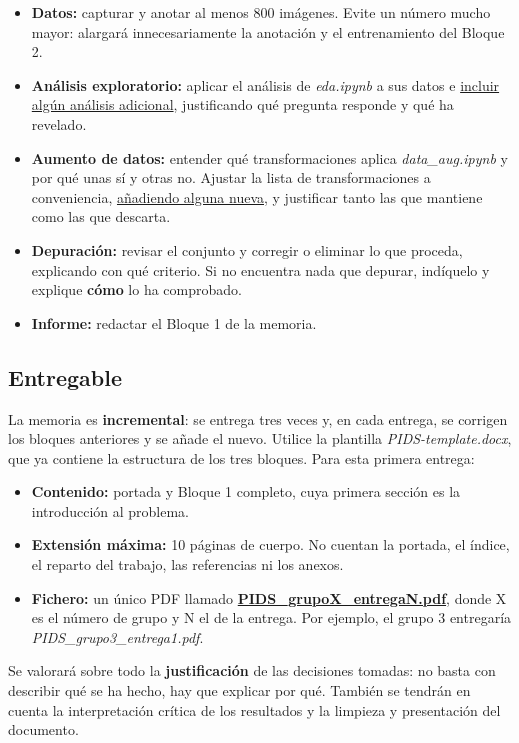 \documentclass[12pt,a4paper]{article}
\begin{document}
\begin{itemize}
    \item \textbf{Datos:} capturar y anotar al menos 800 imágenes. Evite un número mucho mayor: alargará innecesariamente la anotación y el entrenamiento del Bloque 2.
    \item \textbf{Análisis exploratorio:} aplicar el análisis de \textit{eda.ipynb} a sus datos e \underline{incluir algún análisis adicional}, justificando qué pregunta responde y qué ha revelado.
    \item \textbf{Aumento de datos:} entender qué transformaciones aplica \textit{data\_aug.ipynb} y por qué unas sí y otras no. Ajustar la lista de transformaciones a conveniencia, \underline{añadiendo alguna nueva}, y justificar tanto las que mantiene como las que descarta.
    \item \textbf{Depuración:} revisar el conjunto y corregir o eliminar lo que proceda, explicando con qué criterio. Si no encuentra nada que depurar, indíquelo y explique \textbf{cómo} lo ha comprobado.
    \item \textbf{Informe:} redactar el Bloque 1 de la memoria.
\end{itemize}

\subsection{Entregable}

La memoria es \textbf{incremental}: se entrega tres veces y, en cada entrega, se corrigen los bloques anteriores y se añade el nuevo. Utilice la plantilla \textit{PIDS-template.docx}, que ya contiene la estructura de los tres bloques. Para esta primera entrega:

\begin{itemize}
    \item \textbf{Contenido:} portada y Bloque 1 completo, cuya primera sección es la introducción al problema.
    \item \textbf{Extensión máxima:} 10 páginas de cuerpo. No cuentan la portada, el índice, el reparto del trabajo, las referencias ni los anexos.
    \item \textbf{Fichero:} un único PDF llamado \underline{\textbf{PIDS\_grupoX\_entregaN.pdf}}, donde X es el número de grupo y N el de la entrega. Por ejemplo, el grupo 3 entregaría \textit{PIDS\_grupo3\_entrega1.pdf}.
\end{itemize}

Se valorará sobre todo la \textbf{justificación} de las decisiones tomadas: no basta con describir qué se ha hecho, hay que explicar por qué. También se tendrán en cuenta la interpretación crítica de los resultados y la limpieza y presentación del documento.
\end{document}
